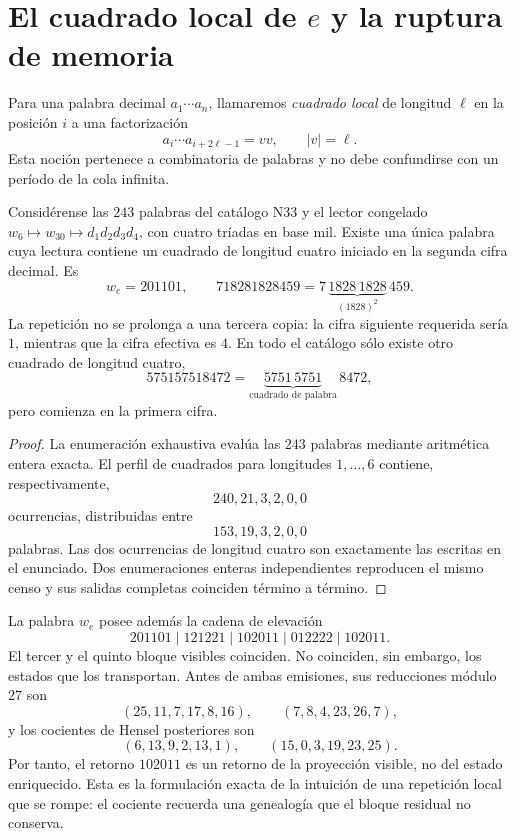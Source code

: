 \ifdefined\HMTRepetirResultadosTaxonomicos
\section{El cuadrado local de \texorpdfstring{\(e\)}{e} y la ruptura de memoria}

Para una palabra decimal \(a_1\cdots a_n\), llamaremos \emph{cuadrado local}
de longitud \(\ell\) en la posición \(i\) a una factorización
\[
 a_i\cdots a_{i+2\ell-1}=vv,
 \qquad |v|=\ell.
\]
Esta noción pertenece a combinatoria de palabras y no debe confundirse con
un período de la cola infinita.

\begin{theorem}
Considérense las \(243\) palabras del catálogo N33 y el lector congelado
\(w_6\mapsto w_{30}\mapsto d_1d_2d_3d_4\), con cuatro tríadas en base mil.
Existe una única palabra cuya lectura contiene un cuadrado de longitud cuatro
iniciado en la segunda cifra decimal. Es
\[
 w_e=201101,
 \qquad
 718281828459=7\,\underbrace{1828\,1828}_{(1828)^2}\,459.
\]
La repetición no se prolonga a una tercera copia: la cifra siguiente requerida
sería \(1\), mientras que la cifra efectiva es \(4\). En todo el catálogo sólo
existe otro cuadrado de longitud cuatro,
\[
 575157518472=\underbrace{5751\,5751}_{\text{cuadrado de palabra}}\,8472,
\]
pero comienza en la primera cifra.
\end{theorem}

\begin{proof}
La enumeración exhaustiva evalúa las \(243\) palabras mediante aritmética
entera exacta. El perfil de cuadrados para longitudes \(1,\ldots,6\) contiene,
respectivamente,
\[
240, 21, 3, 2, 0, 0
\]
ocurrencias, distribuidas entre
\[
153, 19, 3, 2, 0, 0
\]
palabras. Las dos ocurrencias de longitud cuatro son exactamente las escritas
en el enunciado. Dos enumeraciones enteras independientes reproducen el mismo
censo y sus salidas completas coinciden término a término.
\end{proof}

La palabra \(w_e\) posee además la cadena de elevación
\[
201101\mid121221\mid102011\mid012222\mid102011.
\]
El tercer y el quinto bloque visibles coinciden. No coinciden, sin embargo,
los estados que los transportan. Antes de ambas emisiones, sus reducciones
módulo \(27\) son
\[
(25,11,7,17,8,16),
\qquad
(7,8,4,23,26,7),
\]
y los cocientes de Hensel posteriores son
\[
(6,13,9,2,13,1),
\qquad
(15,0,3,19,23,25).
\]
Por tanto, el retorno \(102011\) es un retorno de la proyección visible, no
del estado enriquecido. Esta es la formulación exacta de la intuición de una
repetición local que se rompe: el cociente recuerda una genealogía que el
bloque residual no conserva.

